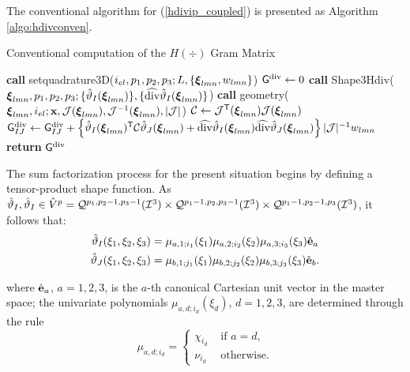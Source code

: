 The conventional algorithm for (\ref{hdivip_coupled}) is presented as Algorithm \ref{algo:hdivconven}.
% 
\begin{algorithm}[ht]
\caption{Conventional computation of the $H(\div)$ Gram Matrix}\label{algo:hdivconven}
\begin{algorithmic}
\State\textbf{call }setquadrature3D($i_{el},p_1,p_2,p_3;L,\{\boldsymbol{\xi}_{lmn},w_{lmn}\}$)
\State $\mathsf{G}^{\operatorname{div}} \gets 0$
            \State\textbf{call } Shape3Hdiv($\boldsymbol{\xi}_{lmn},p_1,p_2,p_3;\{\hat{\vartheta}_I(\boldsymbol{\xi}_{lmn})\},\{\widehat{\operatorname{div}}\hat{\vartheta}_I(\boldsymbol{\xi}_{lmn})\}$)
            \State\textbf{call } geometry( $\boldsymbol{\xi}_{lmn},i_{el};\mathbf{x},\mathcal{J}(\boldsymbol{\xi}_{lmn}),\mathcal{J}^{-1}(\boldsymbol{\xi}_{lmn}),|\mathcal{J}|$)
            \State $\mathcal{C}\gets\mathcal{J}^{\mathsf{T}}(\boldsymbol{\xi}_{lmn})\mathcal{J}(\boldsymbol{\xi}_{lmn})$
                    \State $\mathsf{G}_{IJ}^{\operatorname{div}} \gets \mathsf{G}_{IJ}^{\operatorname{div}}+\left\{\hat{\vartheta}_I(\boldsymbol{\xi}_{lmn})^{\mathsf{T}}\mathcal{C}\hat{\vartheta}_J(\boldsymbol{\xi}_{lmn})+\widehat{\operatorname{div}}\hat{\vartheta}_I(\boldsymbol{\xi}_{lmn})\widehat{\operatorname{div}}\hat{\vartheta}_J(\boldsymbol{\xi}_{lmn})\right\}|\mathcal{J}|^{-1}w_{lmn}$
                \EndFor
            \EndFor
\EndFor
\State \textbf{return} $\mathsf{G}^{\operatorname{div}}$
\EndProcedure
\end{algorithmic}
\end{algorithm}

The sum factorization process for the present situation begins by defining a tensor-product shape function. As $\hat{\vartheta}_I,\hat{\vartheta}_I\in \hat{V}^p=\mathcal{Q}^{p_1,p_2-1,p_3-1}(\mathcal{I}^3)\times\mathcal{Q}^{p_1-1,p_2,p_3-1}(\mathcal{I}^3)\times\mathcal{Q}^{p_1-1,p_2-1,p_3}(\mathcal{I}^3)$, it follows that:
\begin{equation}
    \begin{aligned}
    \hat{\vartheta}_I(\xi_1,\xi_2,\xi_3)&= \mu_{a,1;i_1}(\xi_1)\mu_{a,2;i_2}(\xi_2)\mu_{a,3;i_3}(\xi_3)\hat{\mathbf{e}}_a\\
    \hat{\vartheta}_J(\xi_1,\xi_2,\xi_3)&= \mu_{b,1;j_1}(\xi_1)\mu_{b,2;j_2}(\xi_2)\mu_{b,3;j_3}(\xi_3)\hat{\mathbf{e}}_b.
    \end{aligned}
    \label{hdivtensor}
\end{equation}

\noindent where $\hat{\mathbf{e}}_a$, $a=1,2,3$, is the $a$-th canonical Cartesian unit vector in the master space; the univariate polynomials $\mu_{a,d;i_d}(\xi_d)$, $d=1,2,3$, are determined through the rule
\begin{equation}
    \mu_{a,d;i_d}=  \begin{cases}
                    \chi_{i_d}&\text{ if }a=d,\\
                    \nu_{i_d} &\text{ otherwise.}
                    \end{cases}
    \label{hdivrule}
\end{equation}

